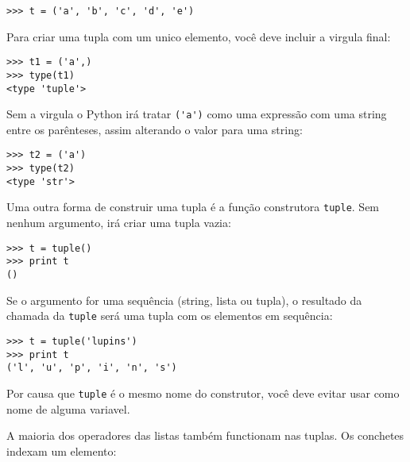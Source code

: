 
\beforeverb
\begin{verbatim}
>>> t = ('a', 'b', 'c', 'd', 'e')
\end{verbatim}
\afterverb
%
Para criar uma tupla com um unico elemento, você deve incluir a virgula
final:


\beforeverb
\begin{verbatim}
>>> t1 = ('a',)
>>> type(t1)
<type 'tuple'>
\end{verbatim}
\afterverb
%
Sem a virgula o Python irá tratar \verb"('a')" como uma expressão
com uma string entre os parênteses, assim alterando o valor para uma string:

\beforeverb
\begin{verbatim}
>>> t2 = ('a')
>>> type(t2)
<type 'str'>
\end{verbatim}
\afterverb
%
Uma outra forma de construir uma tupla é a função construtora {\tt tuple}.
Sem nenhum argumento, irá criar uma tupla vazia:


\beforeverb
\begin{verbatim}
>>> t = tuple()
>>> print t
()
\end{verbatim}
\afterverb
%
Se o argumento for uma sequência (string, lista ou tupla), o resultado
da chamada da {\tt tuple} será uma tupla com os elementos em sequência:

\beforeverb
\begin{verbatim}
>>> t = tuple('lupins')
>>> print t
('l', 'u', 'p', 'i', 'n', 's')
\end{verbatim}
\afterverb
%
Por causa que {\tt tuple} é o mesmo nome do construtor, você deve
evitar usar como nome de alguma variavel.

A maioria dos operadores das listas também functionam nas tuplas.
Os conchetes indexam um elemento:

